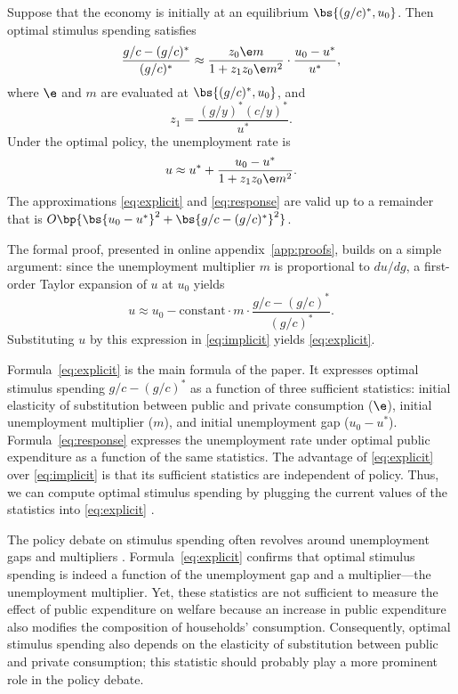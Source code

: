 \documentclass[letterpaper,12pt,leqno]{article}
\begin{document}
\begin{bibunit}
\begin{prop}\label{prop:explicit} Suppose that the economy is initially at an equilibrium $\bs{(g/c)^{*},u_{0}}$. Then optimal stimulus spending satisfies
\begin{equation}
\frac{g/c-(g/c)^{*}}{(g/c)^{*}} \approx \frac{z_0 \e  m}{1 + z_1 z_0 \e  m^{2}}\cdot \frac{u_{0}-u^{*}}{u^{*}},
\label{eq:explicit}\end{equation}
where $\e$ and $m$ are evaluated at $\bs{(g/c)^{*},u_{0}}$, and
\begin{equation*}
 z_1 = \frac{(g/y)^{*}(c/y)^{*}}{u^{*}}. 
\end{equation*}
Under the optimal policy, the unemployment rate is
\begin{equation}
u\approx u^{*}+\frac{u_{0}-u^{*}}{1+ z_1 z_0 \e m^{2}}.
\label{eq:response}\end{equation}
The approximations \eqref{eq:explicit} and \eqref{eq:response} are valid up to a remainder that is $O\bp{\bs{u_{0}-u^{*}}^{2}+\bs{g/c-(g/c)^{*}}^{2}}$.\end{prop}

The formal proof, presented in online appendix~\ref{app:proofs}, builds on a simple argument: since the unemployment multiplier $m$ is proportional to $du/dg$, a first-order Taylor expansion of $u$ at $u_{0}$ yields
\begin{equation*}
u\approx u_{0} - \text{constant} \cdot m \cdot \frac{g/c-(g/c)^{*}}{(g/c)^{*}}.
\end{equation*}
Substituting $u$ by this expression in \eqref{eq:implicit} yields \eqref{eq:explicit}. 

Formula~\eqref{eq:explicit} is the main formula of the paper. It expresses optimal stimulus spending $g/c-(g/c)^{*}$ as a function of three sufficient statistics: initial elasticity of substitution between public and private consumption ($\e$), initial unemployment multiplier ($m$), and initial unemployment gap ($u_{0}-u^{*}$). Formula~\eqref{eq:response} expresses the unemployment rate under optimal public expenditure as a function of the same statistics. The advantage of \eqref{eq:explicit} over \eqref{eq:implicit} is that its sufficient statistics are independent of policy. Thus, we can compute optimal stimulus spending by plugging the current values of the statistics into \eqref{eq:explicit} .

The policy debate on stimulus spending often revolves around unemployment gaps and multipliers . Formula~\eqref{eq:explicit} confirms that optimal stimulus spending is indeed a function of the unemployment gap and a multiplier---the unemployment multiplier. Yet, these statistics are not sufficient to measure the effect of public expenditure on welfare because an increase in public expenditure also modifies the composition of households' consumption. Consequently, optimal stimulus spending also depends on the elasticity of substitution between public and private consumption; this statistic should probably play a more prominent role in the policy debate.


\end{bibunit}
\end{document}

